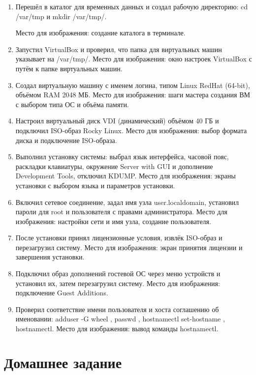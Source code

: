 \documentclass[
  english,
  russian,
  12pt,
  a4paper,
  DIV=11,
  numbers=noendperiod]{scrreprt}
\begin{document}
\begin{enumerate}
\def\labelenumi{\arabic{enumi}.}
\item
  Перешёл в каталог для временных данных и создал рабочую директорию: cd
  /var/tmp и mkdir /var/tmp/.

  Место для изображения: создание каталога в терминале.
\item
  Запустил VirtualBox и проверил, что папка для виртуальных машин
  указывает на /var/tmp/. Место для изображения: окно настроек
  VirtualBox с путём к папке виртуальных машин.
\item
  Создал виртуальную машину с именем логина, типом Linux RedHat
  (64-bit), объёмом RAM 2048 МБ. Место для изображения: шаги мастера
  создания ВМ с выбором типа ОС и объёма памяти.
\item
  Настроил виртуальный диск VDI (динамический) объёмом 40 ГБ и подключил
  ISO-образ Rocky Linux. Место для изображения: выбор формата диска и
  подключение ISO-образа.
\item
  Выполнил установку системы: выбрал язык интерфейса, часовой пояс,
  раскладки клавиатуры, окружение Server with GUI и дополнение
  Development Tools, отключил KDUMP. Место для изображения: экраны
  установки с выбором языка и параметров установки.
\item
  Включил сетевое соединение, задал имя узла user.localdomain, установил
  пароли для root и пользователя с правами администратора. Место для
  изображения: настройки сети и имя узла, создание пользователя.
\item
  После установки принял лицензионные условия, извлёк ISO-образ и
  перезагрузил систему. Место для изображения: экран принятия лицензии и
  завершения установки.
\item
  Подключил образ дополнений гостевой ОС через меню устройств и
  установил их, затем перезагрузил систему. Место для изображения:
  подключение Guest Additions.
\item
  Проверил соответствие имени пользователя и хоста соглашению об
  именовании: adduser -G wheel , passwd , hostnamectl set-hostname ,
  hostnamectl. Место для изображения: вывод команды hostnamectl.
\end{enumerate}

\chapter{Домашнее
задание}\label{ux434ux43eux43cux430ux448ux43dux435ux435-ux437ux430ux434ux430ux43dux438ux435}
\end{document}
